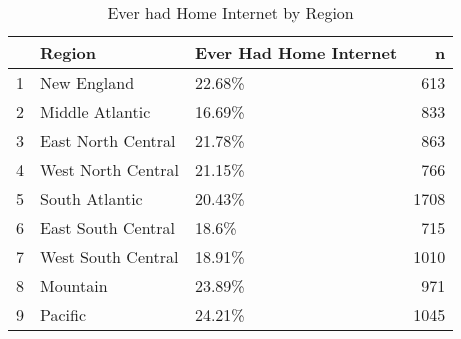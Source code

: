 \begin{table}[ht]
\centering
\begin{tabular}{rllr}
  \hline
 & Region & Ever Had Home Internet & n \\ 
  \hline
1 & New England & 22.68\% & 613 \\ 
  2 & Middle Atlantic & 16.69\% & 833 \\ 
  3 & East North Central & 21.78\% & 863 \\ 
  4 & West North Central & 21.15\% & 766 \\ 
  5 & South Atlantic & 20.43\% & 1708 \\ 
  6 & East South Central & 18.6\% & 715 \\ 
  7 & West South Central & 18.91\% & 1010 \\ 
  8 & Mountain & 23.89\% & 971 \\ 
  9 & Pacific & 24.21\% & 1045 \\ 
   \hline
\end{tabular}
\caption{Ever had Home Internet by Region} 
\end{table}
